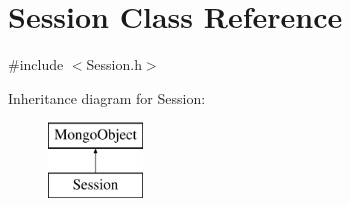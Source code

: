 \hypertarget{class_session}{}\section{Session Class Reference}
\label{class_session}


{\ttfamily \#include $<$Session.\+h$>$}

Inheritance diagram for Session\+:\begin{figure}[H]
\begin{center}
\leavevmode
\includegraphics[height=2.000000cm]{class_session}
\end{center}
\end{figure}
